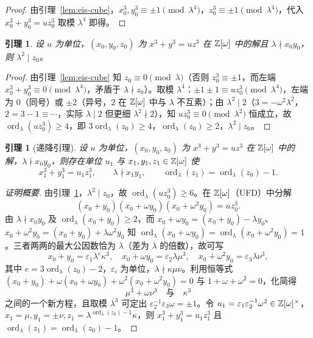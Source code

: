 \documentclass{article}
\newcommand{\ord}{\operatorname{ord}}
\theoremstyle{plain}
\newtheorem{lem}[thm]{引理}
\theoremstyle{definition}
\theoremstyle{remark}
\begin{document}
\begin{proof}
  由引理~\ref{lem:eis-cube}，$x_0^3,y_0^3\equiv\pm1\pmod{\lambda^4}$，$z_0^3\equiv\pm1\pmod{\lambda^4}$，代入 $x_0^3+y_0^3=uz_0^3$ 取模 $\lambda^4$ 即得。
\end{proof}

\begin{lem}\label{lem:eis-descent-z}
  设 $u$ 为单位，$(x_0,y_0,z_0)$ 为 $x^3+y^3=uz^3$ 在 $\mathbb{Z}[\omega]$ 中的解且 $\lambda\nmid x_0y_0$，则 $\lambda^2\mid z_0$。
\end{lem}

\begin{proof}
  由引理~\ref{lem:eis-cube} 知 $z_0\equiv0\pmod\lambda$（否则 $z_0^3\equiv\pm1$，而左端 $x_0^3+y_0^3\equiv0\pmod{\lambda^4}$，矛盾于 $\lambda\nmid z_0$）。取模 $\lambda^4$：$\pm1\pm1\equiv uz_0^3\pmod{\lambda^4}$，左端为 $0$（同号）或 $\pm2$（异号，$2$ 在 $\mathbb{Z}[\omega]$ 中与 $\lambda$ 不互素）；由 $\lambda^2\mid 2$（$3=-\omega^2\lambda^2$，$2=3-1\equiv\cdots$，实际 $\lambda\mid 2$ 但更细 $\lambda^2\nmid2$），知 $uz_0^3\equiv0\pmod{\lambda^2}$ 恒成立，故 $\ord_\lambda(uz_0^3)\ge4$，即 $3\ord_\lambda(z_0)\ge4$，$\ord_\lambda(z_0)\ge2$，$\lambda^2\mid z_0$。
\end{proof}

\begin{lem}[递降引理]\label{lem:eis-descent}
  设 $u$ 为单位，$(x_0,y_0,z_0)$ 为 $x^3+y^3=uz^3$ 在 $\mathbb{Z}[\omega]$ 中的解，$\lambda\nmid x_0y_0$，则存在单位 $u_1$ 与 $x_1,y_1,z_1\in\mathbb{Z}[\omega]$ 使
  \[
    x_1^3+y_1^3=u_1z_1^3,\qquad \lambda\nmid x_1y_1,\qquad \ord_\lambda(z_1)=\ord_\lambda(z_0)-1.
  \]
\end{lem}

\begin{proof}[证明概要]
  由引理~\ref{lem:eis-descent-z}，$\lambda^2\mid z_0$，故 $\ord_\lambda(uz_0^3)\ge6$。在 $\mathbb{Z}[\omega]$（UFD）中分解
  \[
    (x_0+y_0)(x_0+\omega y_0)(x_0+\omega^2y_0)=uz_0^3.
  \]
  由 $\lambda\nmid x_0y_0$ 及 $\ord_\lambda(x_0+y_0)\ge2$，而 $x_0+\omega y_0=(x_0+y_0)-\lambda y_0$、$x_0+\omega^2y_0=(x_0+y_0)+\lambda\omega^2y_0$ 知 $\ord_\lambda(x_0+\omega y_0)=\ord_\lambda(x_0+\omega^2y_0)=1$。三者两两的最大公因数恰为 $\lambda$（差为 $\lambda$ 的倍数），故可写
  \[
    x_0+y_0=\varepsilon_1\lambda^e\kappa^3,\quad x_0+\omega y_0=\varepsilon_2\lambda\mu^3,\quad x_0+\omega^2y_0=\varepsilon_3\lambda\nu^3,
  \]
  其中 $e=3\ord_\lambda(z_0)-2$，$\varepsilon_i$ 为单位，$\lambda\nmid\kappa\mu\nu$。利用恒等式 $(x_0+y_0)+\omega(x_0+\omega y_0)+\omega^2(x_0+\omega^2y_0)=0$ 与 $1+\omega+\omega^2=0$，化简得
  \[
    \mu^3+\omega\nu^3\quad\text{与}\quad\kappa^3
  \]
  之间的一个新方程，且取模 $\lambda^3$ 可定出 $\varepsilon_2^{-1}\varepsilon_3\omega=\pm1$。令 $u_1=\varepsilon_1\varepsilon_2^{-1}\omega^2\in\mathbb{Z}[\omega]^\times$，$x_1=\mu,y_1=\pm\nu,z_1=\lambda^{\ord_\lambda(z_0)-1}\kappa$，则 $x_1^3+y_1^3=u_1z_1^3$ 且 $\ord_\lambda(z_1)=\ord_\lambda(z_0)-1$。
\end{proof}
\end{document}
